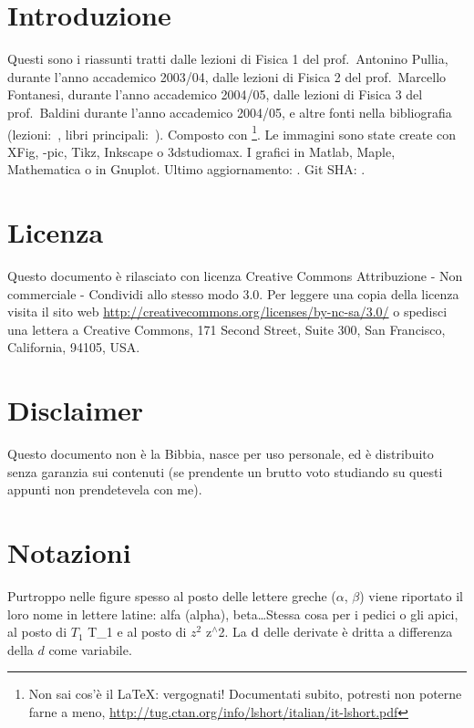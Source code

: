 \sffamily\itshape
\section*{\centering Introduzione}

Questi sono i riassunti tratti dalle lezioni di Fisica 1 del %
prof.~Antonino Pullia, durante l'anno accademico 2003/04, dalle lezioni di Fisica 2 del prof.~Marcello Fontanesi, durante l'anno accademico 2004/05, dalle lezioni di Fisica 3 del prof.~Baldini durante l'anno accademico 2004/05, e altre fonti nella bibliografia (lezioni:~\cite{Pullia, Fontanesi, Baldini, Paganoni, Lucchini, Franzoni, Monica, Barney, Maddalena}, libri principali:~\cite{Fisica1, Feynm, modern, elettro, ottica, enge, alonso, jackson, mazzoldi}). Composto con \LaTeXe\footnote{Non sai cos'è il \LaTeX: vergognati! Documentati subito, potresti non poterne farne a meno, \href{http://tug.ctan.org/info/lshort/italian/it-lshort.pdf}{http://tug.ctan.org/info/lshort/italian/it-lshort.pdf}}. Le immagini sono state create con XFig, \Xy-pic, Tikz, Inkscape o 3dstudiomax. I grafici in Matlab, Maple, Mathematica o in Gnuplot.
\newline\newline
Ultimo aggiornamento: \gitAuthorDate. Git SHA: \texttt{\gitAbbrevHash}.

\section*{\centering Licenza}
Questo documento è rilasciato con licenza Creative Commons Attribuzione - Non commerciale - Condividi allo stesso modo 3.0. Per leggere una copia della licenza visita il sito web \url{http://creativecommons.org/licenses/by-nc-sa/3.0/} o spedisci una lettera a Creative Commons, 171 Second Street, Suite 300, San Francisco, California, 94105, USA. \ccbyncsaeu

\section*{\centering Disclaimer}
Questo documento non è la Bibbia, nasce per uso personale, ed è distribuito senza garanzia sui contenuti (se prendente un brutto voto studiando su questi appunti non prendetevela con me).
\section*{\centering Notazioni}
Purtroppo nelle figure spesso al posto delle lettere greche (\(\alpha\), \(\beta\)) viene riportato il loro nome in lettere latine: alfa (alpha), beta\ldots Stessa cosa per i pedici o gli apici, al posto di \(T_1\) T\_1 e al posto di \(z^2\) z\(^\wedge\)2. La \(\mathrm{d}\) delle derivate è dritta a differenza della \(d\) come variabile.
\newpage
